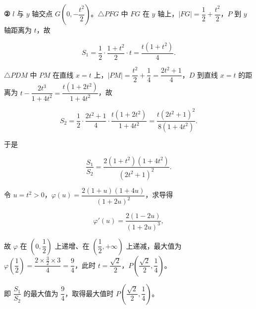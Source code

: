 \begin{answer}
\textbf{②} \(l\) 与 \(y\) 轴交点 \(G\left(0,-\dfrac{t^{2}}{2}\right)\)。\(\triangle PFG\) 中 \(FG\) 在 \(y\) 轴上，\(|FG|=\dfrac{1}{2}+\dfrac{t^{2}}{2}\)，\(P\) 到 \(y\) 轴距离为 \(t\)，故

\nopagebreak[4]
\[
S_{1}=\dfrac{1}{2}\cdot\dfrac{1+t^{2}}{2}\cdot t=\dfrac{t(1+t^{2})}{4}.
\]

\(\triangle PDM\) 中 \(PM\) 在直线 \(x=t\) 上，\(|PM|=\dfrac{t^{2}}{2}+\dfrac{1}{4}=\dfrac{2t^{2}+1}{4}\)，\(D\) 到直线 \(x=t\) 的距离为 \(t-\dfrac{2t^{3}}{1+4t^{2}}=\dfrac{t(1+2t^{2})}{1+4t^{2}}\)，故

\nopagebreak[4]
\[
S_{2}=\dfrac{1}{2}\cdot\dfrac{2t^{2}+1}{4}\cdot\dfrac{t(1+2t^{2})}{1+4t^{2}}=\dfrac{t(2t^{2}+1)^{2}}{8(1+4t^{2})}.
\]

于是

\nopagebreak[4]
\[
\dfrac{S_{1}}{S_{2}}=\dfrac{2(1+t^{2})(1+4t^{2})}{(2t^{2}+1)^{2}}.
\]

令 \(u=t^{2}>0\)，\(\varphi(u)=\dfrac{2(1+u)(1+4u)}{(1+2u)^{2}}\)，求导得

\nopagebreak[4]
\[
\varphi'(u)=\dfrac{2(1-2u)}{(1+2u)^{3}},
\]

故 \(\varphi\) 在 \(\left(0,\dfrac{1}{2}\right)\) 上递增、在 \(\left(\dfrac{1}{2},+\infty\right)\) 上递减，最大值为 \(\varphi\left(\dfrac{1}{2}\right)=\dfrac{2\times\frac{3}{2}\times 3}{4}=\dfrac{9}{4}\)，此时 \(t=\dfrac{\sqrt{2}}{2}\)，\(P\left(\dfrac{\sqrt{2}}{2},\dfrac{1}{4}\right)\)。

即 \(\dfrac{S_{1}}{S_{2}}\) 的最大值为 \(\dfrac{9}{4}\)，取得最大值时 \(P\left(\dfrac{\sqrt{2}}{2},\dfrac{1}{4}\right)\)。



\end{answer}